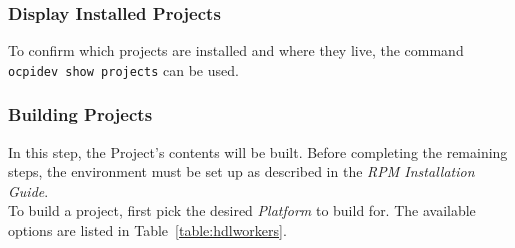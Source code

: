 \subsubsection{Display Installed Projects}
To confirm which projects are installed and where they live, the command \texttt{ocpidev show projects} can be used.
\subsubsection{Building Projects}
\label{subsubsec:buildworkers}
In this step, the Project's contents will be built. Before completing the remaining steps, the environment must be set up as described in the \textit{RPM Installation Guide}.\\

To build a project, first pick the desired \textit{Platform} to build for. The available options are listed in Table~\ref{table:hdlworkers}.

